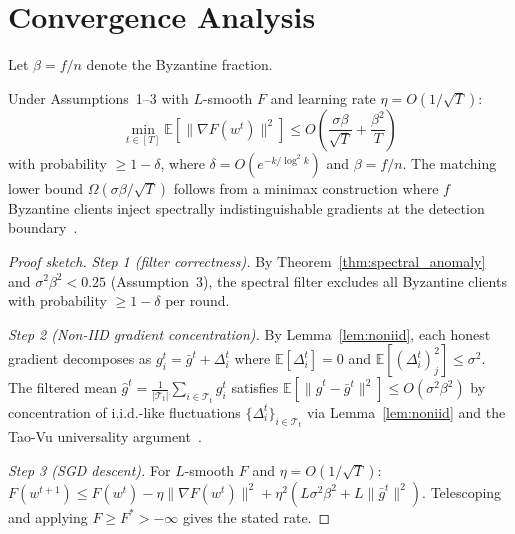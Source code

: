 \section{Convergence Analysis}
\label{sec:convergence}

Let $\beta = f/n$ denote the Byzantine fraction.

\begin{theorem}
\label{thm:convergence}
Under Assumptions~1--3 with $L$-smooth $F$ and learning rate $\eta = O(1/\sqrt{T})$:
\begin{equation}
\min_{t \in [T]}\mathbb{E}[\|\nabla F(w^t)\|^2] \leq O\!\left(\frac{\sigma\beta}{\sqrt{T}} + \frac{\beta^2}{T}\right)
\end{equation}
with probability $\geq 1 - \delta$, where $\delta = O(e^{-k/\log^2 k})$ and $\beta = f/n$.
The matching lower bound $\Omega(\sigma\beta/\sqrt{T})$ follows from a minimax construction
where $f$ Byzantine clients inject spectrally indistinguishable gradients at the detection
boundary~\cite{byzantine_ml}.
\end{theorem}

\begin{proof}[Proof sketch]
\smallskip\noindent\emph{Step 1 (filter correctness).}
By Theorem~\ref{thm:spectral_anomaly} and $\sigma^2\beta^2 < 0.25$ (Assumption~3),
the spectral filter excludes all Byzantine clients with probability $\geq 1 - \delta$ per round.

\smallskip\noindent\emph{Step 2 (Non-IID gradient concentration).}
By Lemma~\ref{lem:noniid}, each honest gradient decomposes as $g_i^t = \bar{g}^t + \Delta_i^t$
where $\mathbb{E}[\Delta_i^t] = 0$ and $\mathbb{E}[(\Delta_i^t)_j^2] \leq \sigma^2$.
The filtered mean $\hat{g}^t = \frac{1}{|\mathcal{T}_t|}\sum_{i \in \mathcal{T}_t} g_i^t$
satisfies $\mathbb{E}[\|\hat{g}^t - \bar{g}^t\|^2] \leq O(\sigma^2\beta^2)$ by
concentration of i.i.d.-like fluctuations $\{\Delta_i^t\}_{i \in \mathcal{T}_t}$
via Lemma~\ref{lem:noniid} and the Tao-Vu universality argument~\cite{rmt_modern}.

\smallskip\noindent\emph{Step 3 (SGD descent).}
For $L$-smooth $F$ and $\eta = O(1/\sqrt{T})$:
$F(w^{t+1}) \leq F(w^t) - \eta\|\nabla F(w^t)\|^2 + \eta^2(L\sigma^2\beta^2 + L\|\bar{g}^t\|^2)$.
Telescoping and applying $F \geq F^* > -\infty$ gives the stated rate.
\end{proof}
